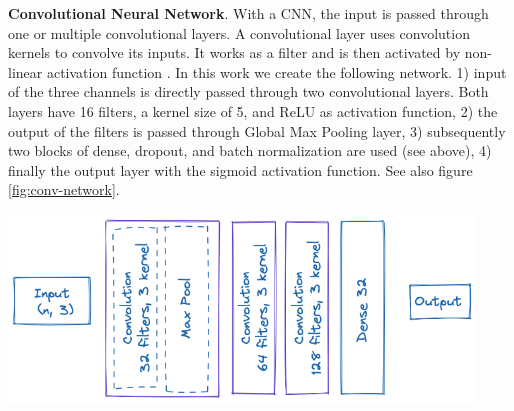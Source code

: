 \begin{minipage}{\textwidth}
\textbf{Convolutional Neural Network}. With a CNN, the input is passed through one or multiple convolutional layers. A convolutional layer uses convolution kernels to convolve its inputs. It works as a filter and is then activated by non-linear activation function \cite{Goodfellow2016}. In this work we create the following network. 1) input of the three channels is directly passed through two convolutional layers. Both layers have 16 filters, a kernel size of 5, and ReLU as activation function, 2) the output of the filters is passed through Global Max Pooling layer, 3) subsequently two blocks of dense, dropout, and batch normalization are used (see above), 4) finally the output layer with the sigmoid activation function. See also figure \ref{fig:conv-network}. 
\baselineskip

\begin{center}
\includegraphics[height=5cm]{images/5_multimodal_fusion/convolution-network.png}
\captionsetup{width=0.90\textwidth}
\label{fig:conv-network}
\end{center}
\end{minipage}

\baselineskip

